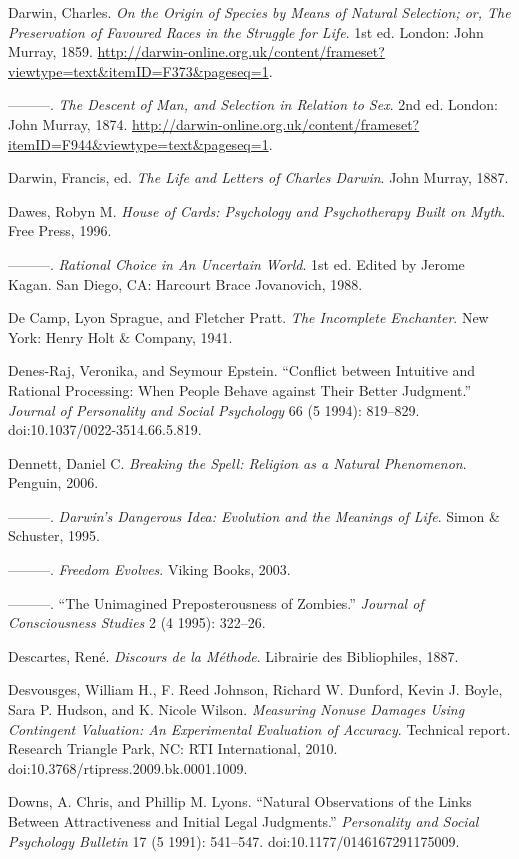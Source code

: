 \documentclass[letterpaper]{book}
\begin{document}
{
 Darwin, Charles. \textit{On the Origin of Species by Means of
Natural Selection; or, The Preservation of Favoured Races in the
Struggle for Life}. 1st ed. London: John Murray, 1859.
\url{http://darwin-online.org.uk/content/frameset?viewtype=text\&itemID=F373\&pageseq=1}.}

{
 {}---{}---{}---. \textit{The Descent of Man, and Selection in
Relation to Sex}. 2nd ed. London: John Murray, 1874.
\url{http://darwin-online.org.uk/content/frameset?itemID=F944\&viewtype=text\&pageseq=1}.}

{
 Darwin, Francis, ed. \textit{The Life and Letters of Charles
Darwin}. John Murray, 1887.}

{
 Dawes, Robyn M. \textit{House of Cards: Psychology and
Psychotherapy Built on Myth}. Free Press, 1996.}

{
 {}---{}---{}---. \textit{Rational Choice in An Uncertain World}.
1st ed. Edited by Jerome Kagan. San Diego, CA: Harcourt Brace
Jovanovich, 1988.}

{
 De Camp, Lyon Sprague, and Fletcher Pratt. \textit{The Incomplete
Enchanter}. New York: Henry Holt \& Company, 1941.}

{
 Denes-Raj, Veronika, and Seymour Epstein.
``Conflict between Intuitive and Rational Processing:
When People Behave against Their Better Judgment.''
\textit{Journal of Personality and Social Psychology} 66 (5 1994):
819--829. doi:10.1037/0022-3514.66.5.819.}

{
 Dennett, Daniel C. \textit{Breaking the Spell: Religion as a
Natural Phenomenon}. Penguin, 2006.}

{
 {}---{}---{}---. \textit{Darwin's Dangerous Idea:
Evolution and the Meanings of Life}. Simon \& Schuster, 1995.}

{
 {}---{}---{}---. \textit{Freedom Evolves}. Viking Books, 2003.}

{
 {}---{}---{}---. ``The Unimagined
Preposterousness of Zombies.'' \textit{Journal of
Consciousness Studies} 2 (4 1995): 322--26.}

{
 Descartes, René. \textit{Discours de la Méthode}. Librairie des
Bibliophiles, 1887.}

{
 Desvousges, William H., F. Reed Johnson, Richard W. Dunford, Kevin
J. Boyle, Sara P. Hudson, and K. Nicole Wilson. \textit{Measuring
Nonuse Damages Using Contingent Valuation: An Experimental Evaluation
of Accuracy}. Technical report. Research Triangle Park, NC: RTI
International, 2010. doi:10.3768/rtipress.2009.bk.0001.1009.}

{
 Downs, A. Chris, and Phillip M. Lyons. ``Natural
Observations of the Links Between Attractiveness and Initial Legal
Judgments.'' \textit{Personality and Social
Psychology Bulletin} 17 (5 1991): 541--547.
doi:10.1177/0146167291175009.}
\end{document}
